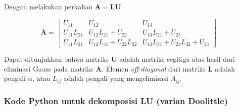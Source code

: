\documentclass[10pt]{article}
\begin{document}
Dengan melakukan perkalian \(\mathbf{A} = \mathbf{LU}\)

\[
\mathbf{A} = \begin{bmatrix}
U_{11} & U_{12} & U_{13} \\
U_{11}L_{21} & U_{12}L_{21} + U_{22} & U_{13}L_{21} + U_{23} \\
U_{11}L_{31} & U_{12}L_{31} + U_{22}L_{32} & U_{13}L_{31} + U_{23}L_{32} + U_{33}
\end{bmatrix}
\]

    Dapat ditunjukkan bahwa matriks \(\mathbf{U}\) adalah matriks segitiga
atas hasil dari eliminasi Gauss pada matriks \(\mathbf{A}\). Elemen
\emph{off-diagonal} dari matriks \(\mathbf{L}\) adalah pengali
\(\alpha\), atau \(L_{ij}\) adalah pengali yang mengelimisasi
\(A_{ij}\).

    \hypertarget{kode-python-untuk-dekomposisi-lu-varian-doolittle}{%
\subsubsection{Kode Python untuk dekomposisi LU (varian
Doolittle)}\label{kode-python-untuk-dekomposisi-lu-varian-doolittle}}
\end{document}
